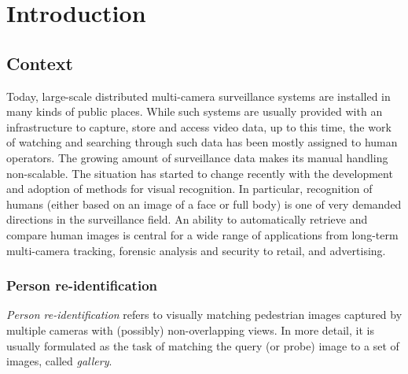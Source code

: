 
\chapter{Introduction}




\section{Context}
Today, large-scale distributed multi-camera surveillance systems are installed in many kinds of public places. While such systems are usually provided with an infrastructure to capture, store and access video data, up to this time, the work of watching and searching through such data has been mostly assigned to human operators. The growing amount of surveillance data makes its manual handling non-scalable. The situation has started to change recently with the development and adoption of methods for visual recognition. %
In particular, recognition of humans (either based on an image of a face or full body) is one of very demanded directions in the surveillance field. An ability to automatically retrieve and compare human images is central for a wide range of applications from long-term multi-camera tracking, forensic analysis and security to retail, and advertising. 



\subsection{Person re-identification}


\textit{Person re-identification} refers to visually matching pedestrian images captured by multiple cameras with (possibly) non-overlapping views. In more detail, it is usually formulated as the task of matching the query (or probe) image to a set of images, called \textit{gallery}. 


